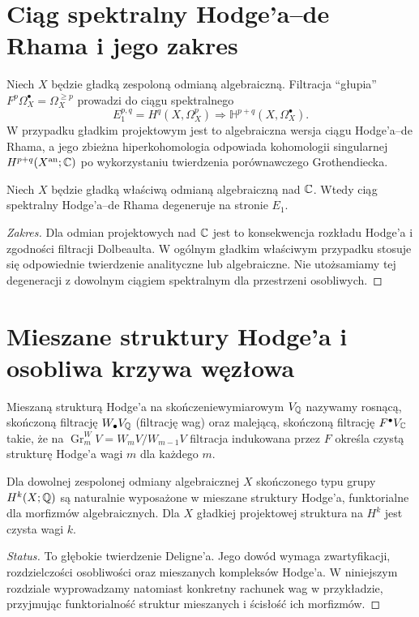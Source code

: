 \section{Ciąg spektralny Hodge'a--de Rhama i jego zakres}
Niech $X$ będzie gładką zespoloną odmianą algebraiczną.
Filtracja ``głupia'' $F^p\Omega_X^\bullet=
\Omega_X^{\ge p}$ prowadzi do ciągu spektralnego
\[
E_1^{p,q}=H^q(X,\Omega_X^p)
\Longrightarrow\mathbb H^{p+q}(X,\Omega_X^\bullet).
\]
W przypadku gładkim projektowym jest to algebraiczna
wersja ciągu Hodge'a--de Rhama, a jego zbieżna
hiperkohomologia odpowiada kohomologii singularnej
$H^{p+q}(X^{\mathrm{an}};\mathbb{C})$ po wykorzystaniu
twierdzenia porównawczego Grothendiecka.
\begin{twierdzenie}
Niech $X$ będzie gładką właściwą odmianą algebraiczną
nad $\mathbb{C}$. Wtedy ciąg spektralny Hodge'a--de Rhama
degeneruje na stronie $E_1$.
\end{twierdzenie}
\begin{proof}[Zakres]
Dla odmian projektowych nad $\mathbb{C}$ jest to konsekwencja
rozkładu Hodge'a i zgodności filtracji Dolbeaulta.
W ogólnym gładkim właściwym przypadku stosuje się
odpowiednie twierdzenie analityczne lub algebraiczne.
Nie utożsamiamy tej degeneracji z dowolnym
ciągiem spektralnym dla przestrzeni osobliwych.
\end{proof}

\section{Mieszane struktury Hodge'a i osobliwa krzywa węzłowa}
\begin{definicja}
Mieszaną strukturą Hodge'a na skończeniewymiarowym
$V_{\mathbb{Q}}$ nazywamy rosnącą, skończoną filtrację
$W_\bullet V_{\mathbb{Q}}$ (filtrację wag) oraz malejącą,
skończoną filtrację $F^\bullet V_{\mathbb{C}}$ takie, że
na $\operatorname{Gr}_m^WV=W_mV/W_{m-1}V$
filtracja indukowana przez $F$ określa czystą
strukturę Hodge'a wagi $m$ dla każdego $m$.
\end{definicja}
\begin{twierdzenie}
Dla dowolnej zespolonej odmiany algebraicznej $X$
skończonego typu grupy $H^k(X;\mathbb{Q})$ są naturalnie
wyposażone w mieszane struktury Hodge'a, funktorialne
dla morfizmów algebraicznych. Dla $X$ gładkiej
projektowej struktura na $H^k$ jest czysta wagi $k$.
\end{twierdzenie}
\begin{proof}[Status]
To głębokie twierdzenie Deligne'a. Jego dowód
wymaga zwartyfikacji, rozdzielczości osobliwości
oraz mieszanych kompleksów Hodge'a. W niniejszym
rozdziale wyprowadzamy natomiast konkretny rachunek
wag w przykładzie, przyjmując funktorialność
struktur mieszanych i ścisłość ich morfizmów.
\end{proof}

